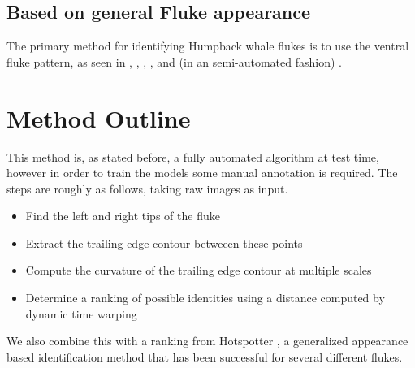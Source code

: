\subsection{Based on general Fluke appearance}

The primary method for identifying Humpback whale flukes is to use the ventral fluke pattern, as seen in \cite{mizroch1990computer}, \cite{carlson1990changes}, \cite{blackmer2000temporal}, \cite{friday2000measurement}, and (in an semi-automated fashion) \cite{kniest2010fluke}. 

\section{Method Outline}

This method is, as stated before, a fully automated algorithm at test time, however in order to train the models some manual annotation is required.
The steps are roughly as follows, taking raw images as input.

\begin{itemize}
	\item Find the left and right tips of the fluke
	\item Extract the trailing edge contour betweeen these points
	\item Compute the curvature of the trailing edge contour at multiple scales
	\item Determine a ranking of possible identities using a distance computed by dynamic time warping 
\end{itemize}

We also combine this with a ranking from Hotspotter \cite{crall_hotspotter_2013}, a generalized appearance based identification method that has been successful for several different flukes. 



